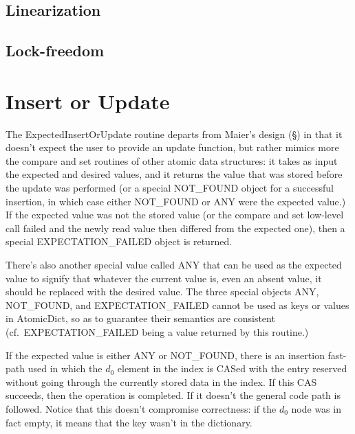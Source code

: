 

\subsection{Linearization}
\subsection{Lock-freedom}

\section{Insert or Update}\label{sec:insert-or-update}



The ExpectedInsertOrUpdate routine departs from Maier's design (\S\cite[Algorithm~1]{maier}) in that it doesn't expect the user to provide an update function, but rather mimics more the compare and set routines of other atomic data structures: it takes as input the expected and desired values, and it returns the value that was stored before the update was performed (or a special NOT\_FOUND object for a successful insertion, in which case either NOT\_FOUND or ANY were the expected value.)
If the expected value was not the stored value (or the compare and set low-level call failed and the newly read value then differed from the expected one), then a special EXPECTATION\_FAILED object is returned.

There's also another special value called ANY that can be used as the expected value to signify that whatever the current value is, even an absent value, it should be replaced with the desired value.
The three special objects ANY, NOT\_FOUND, and EXPECTATION\_FAILED cannot be used as keys or values in AtomicDict, so as to guarantee their semantics are consistent (cf.\ EXPECTATION\_FAILED being a value returned by this routine.)

If the expected value is either ANY or NOT\_FOUND, there is an insertion fast-path used in which the $d_0$ element in the index is CASed with the entry reserved without going through the currently stored data in the index.
If this CAS succeeds, then the operation is completed.
If it doesn't the general code path is followed.
Notice that this doesn't compromise correctness: if the $d_0$ node was in fact empty, it means that the key wasn't in the dictionary.

